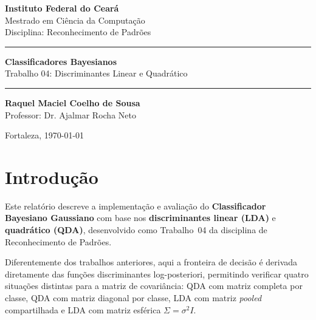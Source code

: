\documentclass[12pt, a4paper]{article}
\begin{document}

\begin{titlepage}
    \begin{flushleft}
        \Large \textbf{Instituto Federal do Ceará} \\
        \large Mestrado em Ciência da Computação \\
        \small Disciplina: Reconhecimento de Padrões
    \end{flushleft}
    \vspace{4cm}
    \begin{center}
        \hrule\vspace{0.5cm}
        {\huge \textbf{\color{brandblue} Classificadores Bayesianos}}\\
        \vspace{0.2cm}
        {\Large Trabalho 04: Discriminantes Linear e Quadrático}
        \vspace{0.5cm}\hrule
    \end{center}
    \vspace{3cm}
    \begin{flushright}
        \large \textbf{Raquel Maciel Coelho de Sousa}\\
        \small Professor: Dr. Ajalmar Rocha Neto
    \end{flushright}
    \vfill
    \begin{center}\small Fortaleza, \today \end{center}
\end{titlepage}

\newpage
{\hypersetup{linkcolor=black}\tableofcontents}
\newpage

\section{Introdução}

Este relatório descreve a implementação e avaliação do
\textbf{Classificador Bayesiano Gaussiano} com base nos
\textbf{discriminantes linear (LDA)} e \textbf{quadrático (QDA)},
desenvolvido como Trabalho~04 da disciplina de Reconhecimento de
Padrões.

Diferentemente dos trabalhos anteriores, aqui a fronteira de decisão
é derivada diretamente das funções discriminantes log-posteriori,
permitindo verificar quatro situações distintas para a matriz de
covariância: QDA com matriz completa por classe, QDA com matriz
diagonal por classe, LDA com matriz \textit{pooled} compartilhada e
LDA com matriz esférica $\Sigma = \sigma^2 I$.
\end{document}
